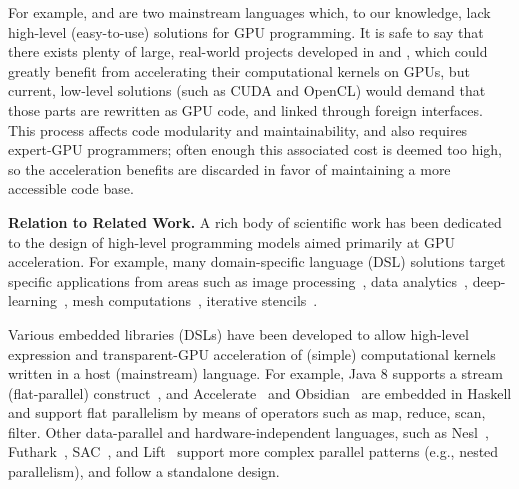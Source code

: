 %
For example, \csharp{} and \fsharp{} are two mainstream languages which, to
our knowledge, lack high-level (easy-to-use) solutions for GPU programming.
%
It is safe to say that there exists plenty of large, real-world projects
developed in \csharp{} and \fsharp{}, which could greatly benefit from 
accelerating their computational kernels on GPUs, but current, low-level
solutions (such as CUDA and OpenCL) would demand that those parts are 
rewritten as GPU code, and linked through foreign interfaces. 
This process affects code modularity and maintainability, and also requires
expert-GPU programmers; often enough this associated cost is deemed too high,
so the acceleration benefits are discarded in favor of maintaining a more 
accessible code base.

{\bf Relation to Related Work.}
%
A rich body of scientific work has been dedicated to the design of high-level 
programming models aimed primarily at GPU acceleration.  
%
For example, many domain-specific language (DSL) solutions target specific 
applications from areas such as image processing~\cite{Halide}, data 
analytics~\cite{HPAT}, deep-learning~\cite{DeliteDSLs}, mesh 
computations~\cite{OP2-Mesh}, iterative stencils~\cite{tang2011pochoir}. 

Various embedded libraries (DSLs) have been developed to allow high-level
expression and transparent-GPU acceleration of (simple) computational 
kernels written in a host (mainstream) language. For example, 
Java $8$ supports a stream (flat-parallel) construct~\cite{StreamJava8},
and Accelerate~\cite{Accelerate-DAMP,AccelerateStreaming} and 
Obsidian~\cite{svensson2011obsidian} are embedded in Haskell and support 
flat parallelism by means of operators such as map, reduce, scan, filter.
%
Other data-parallel and hardware-independent languages, such as 
Nesl~\cite{blelloch1994implementation,Bergstrom:2012:NDG:2398856.2364563},
Futhark~\cite{pldi17,Futhark:redomap,Futhark-ICFP18}, 
SAC~\cite{SaCShared2005,GrelSchoIJPP06}, and Lift~\cite{Lift-CGO17,Lift-ICFP}
support more complex parallel patterns (e.g., nested parallelism), 
and follow a standalone design.

